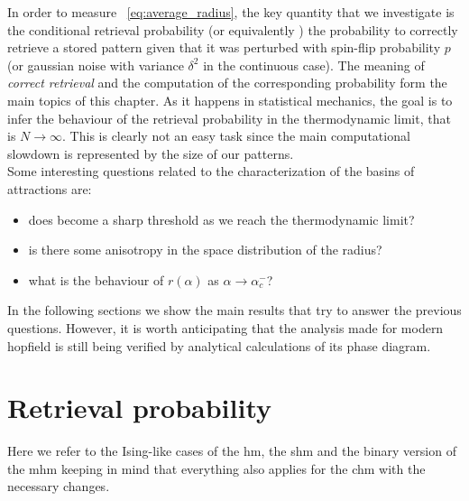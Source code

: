 \documentclass[\rootdir/main.tex]{subfiles}
\begin{document}
In order to measure ~\cref{eq:average_radius}, the key quantity that we investigate is the conditional retrieval probability  (or equivalently \pret{\delta}) \ie the probability to correctly retrieve a stored pattern given that it was perturbed with spin-flip probability $p$ (or gaussian noise with variance $\delta^2$ in the continuous case). The meaning of \emph{correct retrieval} and the computation of the corresponding probability form the main topics of this chapter. As it happens in statistical mechanics, the goal is to infer the behaviour of the retrieval probability in the thermodynamic limit, that is $N \to \infty$. This is clearly not an easy task since the main computational slowdown is represented by the size of our patterns.\\
Some interesting questions related to the characterization of the basins of attractions are:
\begin{itemize}
    \item does  become a sharp threshold as we reach the thermodynamic limit?
    \item is there some anisotropy in the space distribution of the radius?
    \item what is the behaviour of $r(\alpha)$ as $\alpha \to \alpha_c^-$?
\end{itemize}
In the following sections we show the main results that try to answer the previous questions. However, it is worth anticipating that the analysis made for modern hopfield is still being verified by analytical calculations of its phase diagram.

\section{Retrieval probability}
Here we refer to the Ising-like cases of the \acrlong{hm}, \ie the \acrlong{shm} and the binary version of the \acrlong{mhm} keeping in mind that everything also applies for the \acrlong{chm} with the necessary changes.
\end{document}
